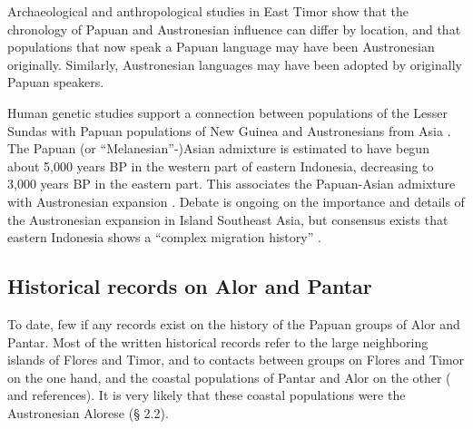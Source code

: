 Archaeological and anthropological studies in East Timor \citep{OConnor2003,OConnnor2007,McWilliam2004} show that the chronology of Papuan and Austronesian influence can differ by location, and that populations that now speak a Papuan language may have been Austronesian originally. Similarly, Austronesian languages may have been adopted by originally Papuan speakers.

Human genetic studies support a connection between populations of the Lesser Sundas with Papuan populations of New Guinea and Austronesians from Asia \citep{LansingEtAl2011,XuEtAl2012}. The Papuan (or ``Melanesian''-)Asian admixture is estimated to have begun about 5,000 years BP in the western part of eastern Indonesia, decreasing to 3,000 years BP in the eastern part. This associates the Papuan-Asian admixture with Austronesian expansion \citep{XuEtAl2012}. Debate is ongoing on the importance and details of the Austronesian expansion in Island Southeast Asia, but consensus exists that eastern Indonesia shows a ``complex migration history'' \citep[263]{LansingEtAl2011}.

\subsection{Historical records on Alor and Pantar}
To date, few if any records exist on the history of the Papuan groups of Alor and Pantar. Most of the written historical records refer to the large neighboring islands of Flores and Timor, and to contacts between groups on Flores and Timor on the one hand, and the coastal populations of Pantar and Alor on the other (\citet{Barnes1996,DeRoever2002,Steenbrink2003,Hagerdal2010a,Hagerdal2010b,Hagerdal2011,Hagerdal2012} and references). It is very likely that these coastal populations were the Austronesian Alorese ({\S} 2.2).

